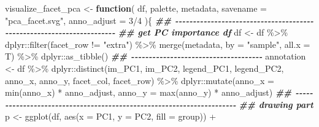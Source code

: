 \documentclass[
]{article}
\newenvironment{Shaded}{\begin{snugshade}}{\end{snugshade}}
\newcommand{\AttributeTok}[1]{\textcolor[rgb]{0.77,0.63,0.00}{#1}}
\newcommand{\ControlFlowTok}[1]{\textcolor[rgb]{0.13,0.29,0.53}{\textbf{#1}}}
\newcommand{\DecValTok}[1]{\textcolor[rgb]{0.00,0.00,0.81}{#1}}
\newcommand{\DocumentationTok}[1]{\textcolor[rgb]{0.56,0.35,0.01}{\textbf{\textit{#1}}}}
\newcommand{\FunctionTok}[1]{\textcolor[rgb]{0.00,0.00,0.00}{#1}}
\newcommand{\NormalTok}[1]{#1}
\newcommand{\OtherTok}[1]{\textcolor[rgb]{0.56,0.35,0.01}{#1}}
\newcommand{\SpecialCharTok}[1]{\textcolor[rgb]{0.00,0.00,0.00}{#1}}
\newcommand{\StringTok}[1]{\textcolor[rgb]{0.31,0.60,0.02}{#1}}
\begin{document}
\begin{Shaded}
\begin{Highlighting}[]
\NormalTok{visualize\_facet\_pca }\OtherTok{\textless{}{-}} 
  \ControlFlowTok{function}\NormalTok{(}
\NormalTok{           df,}
\NormalTok{           palette,}
\NormalTok{           metadata,}
           \AttributeTok{savename =} \StringTok{"pca\_facet.svg"}\NormalTok{,}
           \AttributeTok{anno\_adjust =} \DecValTok{3}\SpecialCharTok{/}\DecValTok{4}
\NormalTok{           )\{}
    \DocumentationTok{\#\# {-}{-}{-}{-}{-}{-}{-}{-}{-}{-}{-}{-}{-}{-}{-}{-}{-}{-}{-}{-}{-}{-}{-}{-}{-}{-}{-}{-}{-}{-}{-}{-}{-}{-}{-}{-}{-}{-}{-}{-}{-}{-}{-}{-}{-}{-}{-}{-}{-}{-}{-}{-}{-}{-}{-}{-}{-}{-}{-}{-}{-}{-}{-}{-}{-}{-}{-}{-}{-}{-} }
    \DocumentationTok{\#\# get PC importance df}
\NormalTok{    df }\OtherTok{\textless{}{-}}\NormalTok{ df }\SpecialCharTok{\%\textgreater{}\%}
\NormalTok{      dplyr}\SpecialCharTok{::}\FunctionTok{filter}\NormalTok{(facet\_row }\SpecialCharTok{!=} \StringTok{"extra"}\NormalTok{) }\SpecialCharTok{\%\textgreater{}\%}
      \FunctionTok{merge}\NormalTok{(metadata, }\AttributeTok{by =} \StringTok{"sample"}\NormalTok{, }\AttributeTok{all.x =}\NormalTok{ T) }\SpecialCharTok{\%\textgreater{}\%}
\NormalTok{      dplyr}\SpecialCharTok{::}\FunctionTok{as\_tibble}\NormalTok{()}
    \DocumentationTok{\#\# {-}{-}{-}{-}{-}{-}{-}{-}{-}{-}{-}{-}{-}{-}{-}{-}{-}{-}{-}{-}{-}{-}{-}{-}{-}{-}{-}{-}{-}{-}{-}{-}{-}{-}{-}{-}{-} }
\NormalTok{    annotation }\OtherTok{\textless{}{-}}\NormalTok{ df }\SpecialCharTok{\%\textgreater{}\%}
\NormalTok{      dplyr}\SpecialCharTok{::}\FunctionTok{distinct}\NormalTok{(im\_PC1, im\_PC2, legend\_PC1, legend\_PC2,}
\NormalTok{                      anno\_x, anno\_y,}
\NormalTok{                      facet\_col, facet\_row) }\SpecialCharTok{\%\textgreater{}\%}
\NormalTok{      dplyr}\SpecialCharTok{::}\FunctionTok{mutate}\NormalTok{(}\AttributeTok{anno\_x =} \FunctionTok{min}\NormalTok{(anno\_x) }\SpecialCharTok{*}\NormalTok{ anno\_adjust,}
                    \AttributeTok{anno\_y =} \FunctionTok{max}\NormalTok{(anno\_y) }\SpecialCharTok{*}\NormalTok{ anno\_adjust)}
    \DocumentationTok{\#\# {-}{-}{-}{-}{-}{-}{-}{-}{-}{-}{-}{-}{-}{-}{-}{-}{-}{-}{-}{-}{-}{-}{-}{-}{-}{-}{-}{-}{-}{-}{-}{-}{-}{-}{-}{-}{-}{-}{-}{-}{-}{-}{-}{-}{-}{-}{-}{-}{-}{-}{-}{-}{-}{-}{-}{-}{-}{-}{-}{-}{-}{-}{-}{-}{-}{-}{-}{-}{-}{-} }
    \DocumentationTok{\#\# drawing part}
\NormalTok{    p }\OtherTok{\textless{}{-}} \FunctionTok{ggplot}\NormalTok{(df, }\FunctionTok{aes}\NormalTok{(}\AttributeTok{x =}\NormalTok{ PC1, }\AttributeTok{y =}\NormalTok{ PC2, }\AttributeTok{fill =}\NormalTok{ group)) }\SpecialCharTok{+}

\end{Highlighting}
\end{Shaded}
\end{document}
